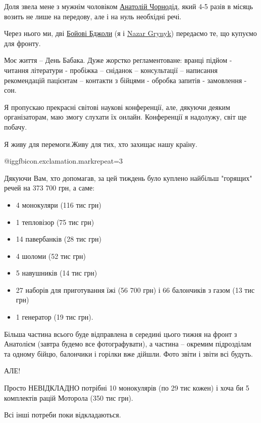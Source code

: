Доля звела мене з мужнім чоловіком
\href{https://www.facebook.com/profile.php?id=100041715156637}{Анатолій
Чорнодід}, який 4-5 разів в місяць возить не лише на передову, але і на нуль
необхідні речі. 

Через нього ми, дві \href{https://www.facebook.com/beeukrainian}{Бойові Бджоли}
(я і \href{https://www.facebook.com/nazar.grynyk}{Nazar Grynyk}) передаємо те,
що купуємо для фронту. 

Моє життя -- День Бабака. Дуже жорстко регламентоване: вранці підйом - читання
літератури - пробіжка -- сніданок -- консультації  -- написання рекомендацій
пацієнтам -- контакти з бійцями - обробка запитів - замовлення - сон. 

Я пропускаю прекрасні світові наукові конференції, але, дякуючи деяким
організаторам, маю змогу слухати їх онлайн. Конференції я надолужу, світ ще
побачу.


Я живу для перемоги.Живу для тих, хто захищає нашу країну. 

@igg{fbicon.exclamation.mark}{repeat=3}

Дякуючи Вам, хто допомагав, за цей тиждень було куплено найбільш "горящих" речей на 373 700 грн, а саме:

\begin{itemize}
  \item 4 монокуляри (116 тис грн)
  \item 1 тепловізор (75 тис грн)
  \item 14 павербанків (28 тис грн)
  \item 4 шоломи (52 тис грн)
  \item 5 навушників (14 тис грн)
  \item 27 наборів для приготування їжі (56 700 грн) і 66 балончиків з газом (13 тис грн)
  \item 1 генератор (19 тис грн).
\end{itemize}

Більша частина всього буде відправлена в середині цього тижня на фронт з
Анатолієм (завтра будемо все фотографувати), а частина -- окремим підрозділам
та одному бійцю, балончики і горілки вже дійшли. Фото звіти і звіти всі будуть.

АЛЕ!

Просто НЕВІДКЛАДНО потрібні 10 монокулярів (по 29 тис кожен) і хоча би 5
комплектів рацій Моторола (350 тис грн). 

Всі інші потреби поки відкладаються.

